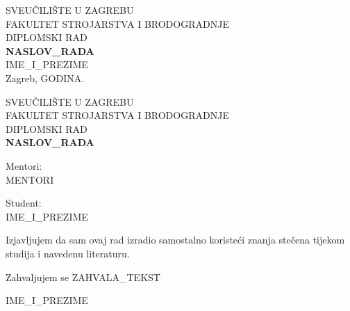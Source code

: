 \documentclass[12pt,a4paper]{article}
\begin{document}
\begin{titlepage}
    \centering
    {\large SVEUČILIŠTE U ZAGREBU\\}
    {\large FAKULTET STROJARSTVA I BRODOGRADNJE\\}
    \vspace{2.5cm}
    {\Large DIPLOMSKI RAD\\}
    \vspace{1.5cm}
    {\Huge \textbf{{{NASLOV_RADA}}}\\}
    \vspace{1.5cm}
    {\large {{IME_I_PREZIME}}\\}
    \vfill
    {\large Zagreb, {{GODINA}}.}
\end{titlepage}

\begin{titlepage}
    \thispagestyle{empty}
    \centering
    {\large SVEUČILIŠTE U ZAGREBU\\}
    {\large FAKULTET STROJARSTVA I BRODOGRADNJE\\}
    \vspace{2.5cm}
    {\Large DIPLOMSKI RAD\\}
    \vspace{1.25cm}
    {\Large \textbf{{{NASLOV_RADA}}}\\}
    \vspace{1.5cm}
    
    \begin{minipage}[t]{0.45\textwidth}
        \begin{flushleft}
            \large Mentori:\\
            {{MENTORI}}
        \end{flushleft}
    \end{minipage}
    \hfill
    \begin{minipage}[t]{0.45\textwidth}
        \begin{flushright}
            \large Student:\\
            {{IME_I_PREZIME}}
        \end{flushright}
    \end{minipage}

    \vfill
    \begin{minipage}{0.9\textwidth}
    \noindent Izjavljujem da sam ovaj rad izradio samostalno koristeći znanja stečena tijekom studija i navedenu literaturu.
    \end{minipage}

    \vspace{1.5cm}

    \begin{minipage}{0.9\textwidth}
    \noindent Zahvaljujem se {{ZAHVALA_TEKST}}
    \end{minipage}

    \vspace{2cm}
    {\large {{IME_I_PREZIME}}}
\end{titlepage}
\end{document}
